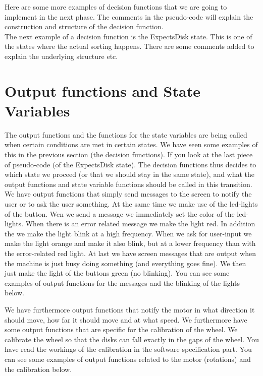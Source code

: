 

Here are some more examples of decision functions that we are going to implement in the next phase. The comments in the pseudo-code will explain the construction and structure of the decision function.\\ 



The next example of a decision function is the ExpectsDisk state. This is one of the states where the actual sorting happens. There are some comments added to explain the underlying structure etc. \\

 
 
 \section{Output functions and State Variables}
The output functions and the functions for the state variables are being called when certain conditions are met in certain states. We have seen some examples of this in the previous section (the decision functions). If you look at the last piece of pseudo-code (of the ExpectsDisk state). The decision functions thus decides to which state we proceed (or that we should stay in the same state), and what the output functions and state variable functions should  be called in this transition. We have output functions that simply send messages to the screen to notify the user or to ask the user something. At the same time we make use of the led-lights of the button. Wen we send a message we immediately set the color of the led-lights. When there is an error related message we make the light red. In addition the we make the light blink at a high frequency. When we ask for user-input we make the light orange and make it also blink, but at a lower frequency than with the error-related red light. At last we have screen messages that are output when the machine is just busy doing something (and everything goes fine). We then just make the light of the buttons green (no blinking). You can see some examples of output functions for the messages and the blinking of the lights below. 

 
 
 We have furthermore output functions that notify the motor in what direction it should move, how far it should move and at what speed. We furthermore have some output functions that are specific for the calibration of the wheel. We calibrate the wheel so that the disks can fall exactly in the gaps of the wheel. You have read the workings of the calibration in the software specification part. You can see some examples of output functions related to the motor (rotations) and the calibration below.
 
